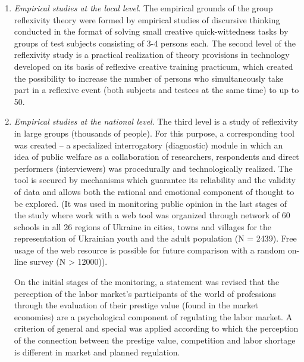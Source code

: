 \documentclass[conference]{IEEEtran}
\begin{document}
\begin{enumerate}
	\item \textit{Empirical studies at the local level}. The empirical grounds of the group reflexivity theory were formed by empirical studies of discursive thinking conducted in the format of solving small creative quick-wittedness tasks by groups of test subjects consisting of 3-4 persons each. The second level of the reflexivity study is a practical realization of theory provisions in technology developed on its basis of reflexive creative training practicum, which created the possibility to increase the number of persons who simultaneously take part in a reflexive event (both subjects and testees at the same time) to up to 50.
	 
	\item \textit{Empirical studies at the national level}. The third level is a study of reflexivity in large groups (thousands of people). For this purpose, a corresponding tool was created – a specialized interrogatory (diagnostic) module in which an idea of public welfare as a collaboration of researchers, respondents and direct performers (interviewers) was procedurally and technologically realized. The tool is secured by mechanisms which guarantee its reliability and the validity of data and allows both the rational and emotional component of thought to be explored. (It was used in monitoring public opinion in the last stages of the study where work with a web tool was organized through network of 60 schools in all 26 regions of Ukraine in cities, towns and villages for the representation of Ukrainian youth and the adult population (N = 2439). Free usage of the web resource is possible for future comparison with a random on-line survey (N > 12000)).

	On the initial stages of the monitoring, a statement was revised that the perception of the labor market’s participants of the world of professions through the evaluation of their prestige value (found in the market economies) are a psychological component of regulating the labor market. A criterion of general and special was applied according to which the perception of the connection between the prestige value, competition and labor shortage is different in market and planned regulation.
	

\end{enumerate}
\end{document}
